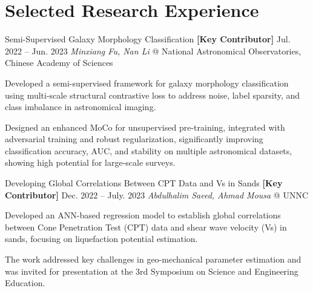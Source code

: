 \section*{Selected Research Experience}
\begin{itemize}[leftmargin=*]
  \item[\raisebox{0.3ex}{\textbullet}]
  \resumeResearchExperience
    {Semi-Supervised Galaxy Morphology Classification}
    {\textbf{[Key Contributor]} Jul. 2022 -- Jun. 2023}
    {\textit{Minxiang Fu, Nan Li} @ National Astronomical Observatories, Chinese Academy of Sciences}
    {
      Developed a semi-supervised framework for galaxy morphology classification using multi-scale structural contrastive loss to address noise, label sparsity, and class imbalance in astronomical imaging. \\
      \item Designed an enhanced MoCo for unsupervised pre-training, integrated with adversarial training and robust regularization, significantly improving classification accuracy, AUC, and stability on multiple astronomical datasets, showing high potential for large-scale surveys.
    }


    \item[\raisebox{0.3ex}{\textbullet}]
    \resumeResearchExperience
      {Developing Global Correlations Between CPT Data and Vs in Sands}
      {\textbf{[Key Contributor]} Dec. 2022 -- July. 2023}
      {\textit{Abdulhalim Saeed, Ahmad Mousa} @ UNNC}
      {
        Developed an ANN-based regression model to establish global correlations between Cone Penetration Test (CPT) data and shear wave velocity (Vs) in sands, focusing on liquefaction potential estimation. \\
        \item The work addressed key challenges in geo-mechanical parameter estimation and was invited for presentation at the 3rd Symposium on Science and Engineering Education.
      }
      


\end{itemize}
